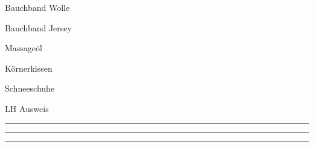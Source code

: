 \begin{MYitemize}
    \item{Bauchband Wolle}
    \item{Bauchband Jersey}
    \item{Massageöl}
    \item{Körnerkissen}
    \item{Schneeschuhe}
    \item{LH Ausweis}
    \item{\rule{50mm}{0.4pt}}
    \item{\rule{50mm}{0.4pt}}
    \item{\rule{50mm}{0.4pt}}
\end{MYitemize}
